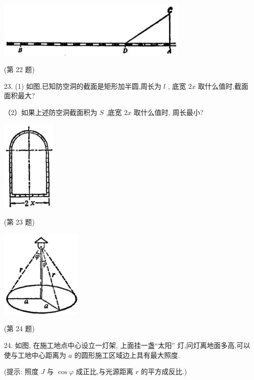\documentclass[10pt]{article}
\begin{document}
\begin{center}
\includegraphics[max width=0.7\textwidth]{images/01912c18-5c3f-733d-b775-749ba9897a9d_158_819415.jpg}
\end{center}

(第 22 题)

23. (1) 如图,已知防空洞的截面是矩形加半圆,周长为 \(l\) , 底宽 \({2x}\) 取什么值时,截面面积最大?

（2）如果上述防空洞截面积为 \(S\) ,底宽 \({2x}\) 取什么值时, 周长最小?

\begin{center}
\includegraphics[max width=0.2\textwidth]{images/01912c18-5c3f-733d-b775-749ba9897a9d_159_493137.jpg}
\end{center}

(第 23 题)

\begin{center}
\includegraphics[max width=0.3\textwidth]{images/01912c18-5c3f-733d-b775-749ba9897a9d_159_646060.jpg}
\end{center}

(第 24 题)

24. 如图, 在施工地点中心设立一灯架, 上面挂一盏“太阳” 灯,问灯离地面多高,可以使与工地中心距离为 \(a\) 的圆形施工区域边上具有最大照度.

(提示: 照度 \(J\) 与 \(\cos \varphi\) 成正比,与光源距离 \(r\) 的平方成反比.)
\end{document}

